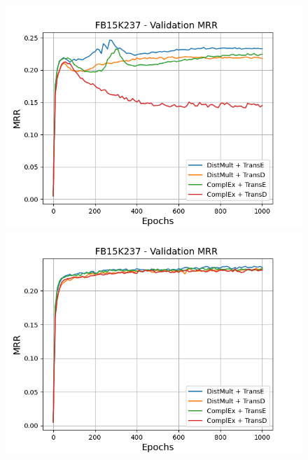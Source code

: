 \begin{figure}[H]
    \centering
    \begin{minipage}{.45\textwidth}
      \centering
      \includegraphics[width=0.9\linewidth]{figures/results/gan_train/not_pretrained/uncertainty/max/entropy/fb15k237/1k_epochs/uncertainty_fb15k237_mrrs.png}
    \end{minipage}%
    \begin{minipage}{.45\textwidth}
      \centering
      \includegraphics[width=0.9\linewidth]{figures/results/gan_train/not_pretrained/uncertainty/max_distribution/entropy/fb15k237/1k_epochs/uncertainty_fb15k237_mrrs.png}
    \end{minipage}
    \begin{minipage}{.45\textwidth}
      \centering

\end{minipage}
\end{figure}

